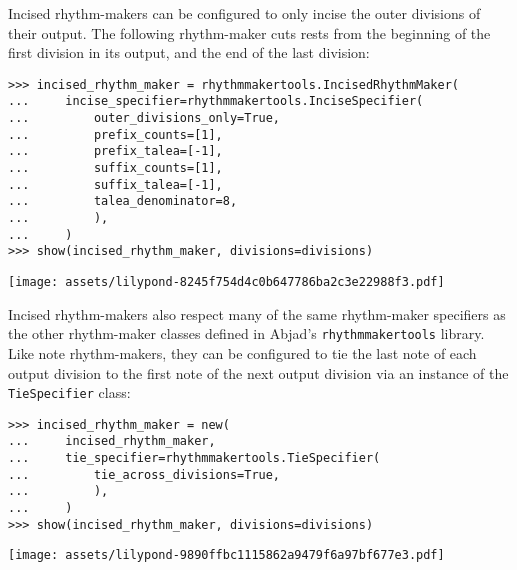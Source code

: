 \noindent Incised rhythm-makers can be configured to only incise the outer
divisions of their output. The following rhythm-maker cuts  rests
from the beginning of the first division in its output, and the end of the last
division:

\begin{comment}
<abjad>
incised_rhythm_maker = rhythmmakertools.IncisedRhythmMaker(
    incise_specifier=rhythmmakertools.InciseSpecifier(
        outer_divisions_only=True,
        prefix_counts=[1],
        prefix_talea=[-1],
        suffix_counts=[1],
        suffix_talea=[-1],
        talea_denominator=8,
        ),
    )
show(incised_rhythm_maker, divisions=divisions)
</abjad>
\end{comment}

\begin{abjadbookoutput}
\begin{singlespacing}
\vspace{-0.5\baselineskip}
\begin{verbatim}
>>> incised_rhythm_maker = rhythmmakertools.IncisedRhythmMaker(
...     incise_specifier=rhythmmakertools.InciseSpecifier(
...         outer_divisions_only=True,
...         prefix_counts=[1],
...         prefix_talea=[-1],
...         suffix_counts=[1],
...         suffix_talea=[-1],
...         talea_denominator=8,
...         ),
...     )
>>> show(incised_rhythm_maker, divisions=divisions)
\end{verbatim}
\noindent\texttt{[image: assets/lilypond-8245f754d4c0b647786ba2c3e22988f3.pdf]}
\end{singlespacing}
\end{abjadbookoutput}

\noindent Incised rhythm-makers also respect many of the same rhythm-maker
specifiers as the other rhythm-maker classes defined in Abjad's
\texttt{rhythmmakertools} library. Like note rhythm-makers, they can be
configured to tie the last note of each output division to the first note of
the next output division via an instance of the \texttt{TieSpecifier} class:

\begin{comment}
<abjad>
incised_rhythm_maker = new(
    incised_rhythm_maker,
    tie_specifier=rhythmmakertools.TieSpecifier(
        tie_across_divisions=True,
        ),
    )
show(incised_rhythm_maker, divisions=divisions)
</abjad>
\end{comment}

\begin{abjadbookoutput}
\begin{singlespacing}
\vspace{-0.5\baselineskip}
\begin{verbatim}
>>> incised_rhythm_maker = new(
...     incised_rhythm_maker,
...     tie_specifier=rhythmmakertools.TieSpecifier(
...         tie_across_divisions=True,
...         ),
...     )
>>> show(incised_rhythm_maker, divisions=divisions)
\end{verbatim}
\noindent\texttt{[image: assets/lilypond-9890ffbc1115862a9479f6a97bf677e3.pdf]}
\end{singlespacing}
\end{abjadbookoutput}

